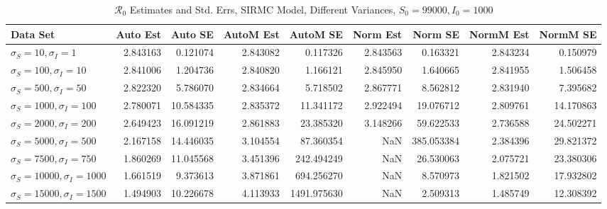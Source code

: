 \documentclass[12pt]{article}
\newcommand{\rr}{\ensuremath{\mathcal{R}_0}}
\begin{document}
\begin{table}[H]
	
	\caption{$\rr$ Estimates and Std. Errs, SIRMC Model,
		Different Variances, 
		$S_0 = 99000, I_0 = 1000$}
	\begin{footnotesize}
		\hskip -1.7cm
	\begin{tabular}{l|r|r|r|r|r|r|r|r}
		\hline
		Data Set & Auto Est & Auto SE & AutoM Est & AutoM SE & Norm Est & Norm SE & NormM Est & NormM SE\\
		\hline
		$\sigma_S = 10, \sigma_I = 1$ & 2.843163 & 0.121074 & 2.843082 & 0.117326 & 2.843563 & 0.163321 & 2.843234 & 0.150979\\
		\hline
		$\sigma_S = 100, \sigma_I = 10$ & 2.841006 & 1.204736 & 2.840820 & 1.166121 & 2.845950 & 1.640665 & 2.841955 & 1.506458\\
		\hline
		$\sigma_S = 500, \sigma_I = 50$ & 2.822320 & 5.786070 & 2.834664 & 5.718502 & 2.867771 & 8.562812 & 2.831940 & 7.395682\\
		\hline
		$\sigma_S = 1000, \sigma_I = 100$ & 2.780071 & 10.584335 & 2.835372 & 11.341172 & 2.922494 & 19.076712 & 2.809761 & 14.170863\\
		\hline
		$\sigma_S = 2000, \sigma_I = 200$ & 2.649423 & 16.091219 & 2.861883 & 23.385320 & 3.148266 & 59.622533 & 2.736588 & 24.502271\\
		\hline
		$\sigma_S = 5000, \sigma_I = 500$ & 2.167158 & 14.446035 & 3.104554 & 87.360354 & NaN & 385.053384 & 2.384396 & 29.821372\\
		\hline
		$\sigma_S = 7500, \sigma_I = 750$ & 1.860269 & 11.045568 & 3.451396 & 242.494249 & NaN & 26.530063 & 2.075721 & 23.380306\\
		\hline
		$\sigma_S = 10000, \sigma_I = 1000$ & 1.661519 & 9.373613 & 3.871861 & 694.256270 & NaN & 8.570973 & 1.821502 & 17.932802\\
		\hline
		$\sigma_S = 15000, \sigma_I = 1500$ & 1.494903 & 10.226678 & 4.113933 & 1491.975630 & NaN & 2.509313 & 1.485749 & 12.308392\\
		\hline
	\end{tabular}
\end{footnotesize}
\end{table}
\end{document}
